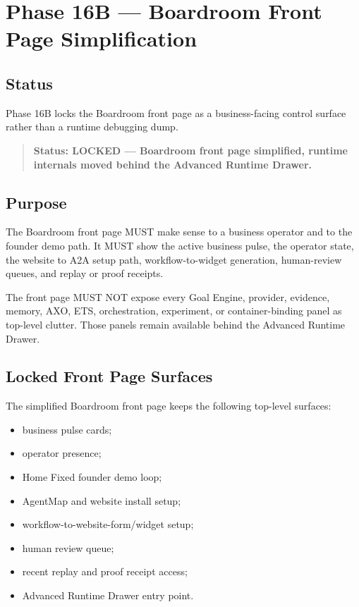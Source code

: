 \section{Phase 16B --- Boardroom Front Page Simplification}
\label{sec:phase16b-boardroom-front-page-simplification}

\subsection{Status}

Phase 16B locks the Boardroom front page as a business-facing control surface rather
than a runtime debugging dump.

\begin{quote}
\textbf{Status: LOCKED --- Boardroom front page simplified, runtime internals moved behind the Advanced Runtime Drawer.}
\end{quote}

\subsection{Purpose}

The Boardroom front page MUST make sense to a business operator and to the founder
demo path. It MUST show the active business pulse, the operator state, the website
to A2A setup path, workflow-to-widget generation, human-review queues, and replay
or proof receipts.

The front page MUST NOT expose every Goal Engine, provider, evidence, memory, AXO,
ETS, orchestration, experiment, or container-binding panel as top-level clutter.
Those panels remain available behind the Advanced Runtime Drawer.

\subsection{Locked Front Page Surfaces}

The simplified Boardroom front page keeps the following top-level surfaces:

\begin{itemize}
  \item business pulse cards;
  \item operator presence;
  \item Home Fixed founder demo loop;
  \item AgentMap and website install setup;
  \item workflow-to-website-form/widget setup;
  \item human review queue;
  \item recent replay and proof receipt access;
  \item Advanced Runtime Drawer entry point.
\end{itemize}

